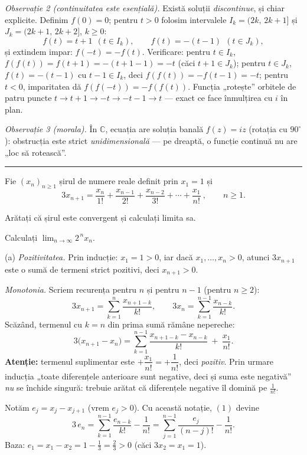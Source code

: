 \emph{Observație 2 (continuitatea este esențială).} Există soluții \emph{discontinue}, și chiar explicite. Definim $f(0)=0$; pentru $t>0$ folosim intervalele $I_{k}=(2k,\,2k+1]$ și $J_{k}=(2k+1,\,2k+2]$, $k\ge0$:
\[ f(t)=t+1\ \ (t\in I_{k}),\qquad f(t)=-(t-1)\ \ (t\in J_{k}) , \]
și extindem impar: $f(-t)=-f(t)$. Verificare: pentru $t\in I_{k}$, $f(f(t))=f(t+1)=-(t+1-1)=-t$ (căci $t+1\in J_{k}$); pentru $t\in J_{k}$, $f(t)=-(t-1)$ cu $t-1\in I_{k}$, deci $f(f(t))=-f(t-1)=-t$; pentru $t<0$, imparitatea dă $f(f(-t))=-f(f(t))$. Funcția „rotește'' orbitele de patru puncte $t\to t+1\to-t\to-t-1\to t$ --- exact ce face înmulțirea cu $i$ în plan.

\emph{Observație 3 (morala).} În $\mathbb{C}$, ecuația are soluția banală $f(z)=iz$ (rotația cu $90^{\circ}$): obstrucția este strict \emph{unidimensională} --- pe dreaptă, o funcție continuă nu are „loc să rotească''.
\vspace{1mm}\hrule

Fie $(x_n)_{n\ge1}$ șirul de numere reale definit prin $x_1=1$ și
\[ 3x_{n+1}=\frac{x_n}{1!}+\frac{x_{n-1}}{2!}+\frac{x_{n-2}}{3!}+\cdots+\frac{x_1}{n!}\ ,\qquad n\ge1 . \]
\begin{parti}
  \item Arătați că șirul este convergent și calculați limita sa.
  \item Calculați $\displaystyle\lim_{n\to\infty}2^{\,n}x_n$.
\end{parti}
\sol (a) \emph{Pozitivitatea.} Prin inducție: $x_1=1>0$, iar dacă $x_1,\dots,x_n>0$, atunci $3x_{n+1}$ este o sumă de termeni strict pozitivi, deci $x_{n+1}>0$.

\emph{Monotonia.} Scriem recurența pentru $n$ și pentru $n-1$ (pentru $n\ge2$):
\[ 3x_{n+1}=\sum_{k=1}^{n}\frac{x_{n+1-k}}{k!},\qquad 3x_{n}=\sum_{k=1}^{n-1}\frac{x_{n-k}}{k!} . \]
Scăzând, termenul cu $k=n$ din prima sumă rămâne nepereche:
\[ 3\bigl(x_{n+1}-x_n\bigr)=\sum_{k=1}^{n-1}\frac{x_{n+1-k}-x_{n-k}}{k!}\ +\ \frac{x_1}{n!} . \tag{1} \]
\textbf{Atenție:} termenul suplimentar este $+\dfrac{x_1}{n!}=+\dfrac1{n!}$, deci \emph{pozitiv}. Prin urmare inducția „toate diferențele anterioare sunt negative, deci și suma este negativă'' \emph{nu} se închide singură: trebuie arătat că diferențele negative îl domină pe $\frac1{n!}$.

Notăm $e_j=x_j-x_{j+1}$ (vrem $e_j>0$). Cu această notație, $(1)$ devine
\[ 3\,e_n=\sum_{k=1}^{n-1}\frac{e_{n-k}}{k!}-\frac{1}{n!}=\sum_{j=1}^{n-1}\frac{e_j}{(n-j)!}-\frac{1}{n!} . \tag{2} \]
Baza: $e_1=x_1-x_2=1-\frac13=\frac23>0$ (căci $3x_2=x_1=1$).

